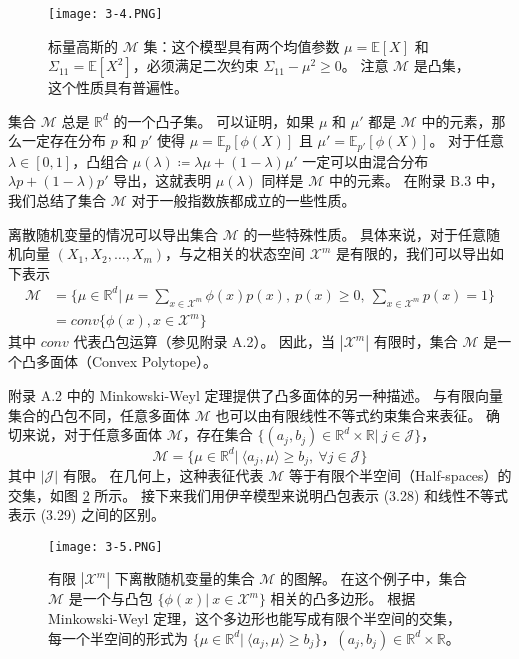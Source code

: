 \begin{figure}[htbp]
    \centering
    \texttt{[image: 3-4.PNG]}
    \caption{
        标量高斯的 $\mathcal{M}$ 集：这个模型具有两个均值参数 $\mu = \mathbb{E}[X]$ 和 $\Sigma_{11} = \mathbb{E}[X^2]$，必须满足二次约束 $\Sigma_{11} - \mu^2 \geq 0$。
        注意 $\mathcal{M}$ 是凸集，这个性质具有普遍性。
    }\label{fig:3-4}
\end{figure}

集合 $\mathcal{M}$ 总是 $\mathbb{R}^d$ 的一个凸子集。
可以证明，如果 $\mu$ 和 $\mu'$ 都是 $\mathcal{M}$ 中的元素，那么一定存在分布 $p$ 和 $p'$ 使得 $\mu = \mathbb{E}_p[\phi(X)]$ 且 $\mu' = \mathbb{E}_{p'}[\phi(X)]$。
对于任意 $\lambda \in [0, 1]$，凸组合 $\mu(\lambda) \coloneqq \lambda\mu + (1-\lambda)\mu'$ 一定可以由混合分布 $\lambda p + (1-\lambda)p'$ 导出，这就表明 $\mu(\lambda)$ 同样是 $\mathcal{M}$ 中的元素。
在附录 B.3 中，我们总结了集合 $\mathcal{M}$ 对于一般指数族都成立的一些性质。

离散随机变量的情况可以导出集合 $\mathcal{M}$ 的一些特殊性质。
具体来说，对于任意随机向量 $(X_1, X_2, \dots, X_m)$，与之相关的状态空间 $\mathcal{X}^m$ 是有限的，我们可以导出如下表示
\begin{align}
    \mathcal{M} &= \{\mu \in \mathbb{R}^d| ~\mu = \sum_{x \in \mathcal{X}^m}\phi(x)p(x), ~p(x) \geq 0, ~\sum_{x \in \mathcal{X}^m}p(x) = 1\} \nonumber \\
    &= conv\{\phi(x), x \in \mathcal{X}^m\} 
\end{align}
其中 $conv$ 代表凸包运算（参见附录 A.2）。
因此，当 $|\mathcal{X}^m|$ 有限时，集合 $\mathcal{M}$ 是一个凸多面体（Convex Polytope）。

附录 A.2 中的 Minkowski-Weyl 定理提供了凸多面体的另一种描述。
与有限向量集合的凸包不同，任意多面体 $\mathcal{M}$ 也可以由有限线性不等式约束集合来表征。
确切来说，对于任意多面体 $\mathcal{M}$，存在集合 $\{(a_j, b_j) \in \mathbb{R}^d \times \mathbb{R}| ~j \in \mathcal{J}\}$，
\begin{equation}
    \mathcal{M} = \{\mu \in \mathbb{R}^d| ~\langle a_j, \mu \rangle \geq b_j, ~\forall j \in \mathcal{J}\}
\end{equation}
其中 $|\mathcal{J}|$ 有限。
在几何上，这种表征代表 $\mathcal{M}$ 等于有限个半空间（Half-spaces）的交集，如图 \ref{fig:3-5} 所示。
接下来我们用伊辛模型来说明凸包表示 (3.28) 和线性不等式表示 (3.29) 之间的区别。

\begin{figure}[htbp]
    \centering
    \texttt{[image: 3-5.PNG]}
    \caption{
        有限 $|\mathcal{X}^m|$ 下离散随机变量的集合 $\mathcal{M}$ 的图解。
        在这个例子中，集合 $\mathcal{M}$ 是一个与凸包 $\{\phi(x)| ~x \in \mathcal{X}^m\}$ 相关的凸多边形。
        根据 Minkowski-Weyl 定理，这个多边形也能写成有限个半空间的交集，每一个半空间的形式为 $\{\mu \in \mathbb{R}^d| ~\langle a_j, \mu \rangle \geq b_j\}$，$(a_j, b_j) \in \mathbb{R}^d \times \mathbb{R}$。
    }\label{fig:3-5}
\end{figure}

